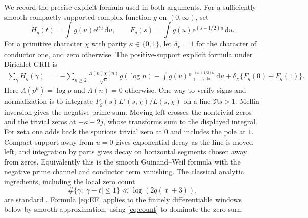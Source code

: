 \documentclass[11pt]{article}
\newcommand{\me}{\mathrm e}
\newcommand{\ii}{\mathrm i}
\newcommand{\dd}{\,\mathrm d}
\begin{document}
We record the precise explicit formula used in both arguments. For a sufficiently smooth compactly supported complex function $g$ on $(0,\infty)$, set
\[
 H_g(t)=\int g(u)\me^{\ii tu}\dd u,\qquad
 F_g(s)=\int g(u)\me^{(s-1/2)u}\dd u .
\]
For a primitive character $\chi$ with parity $\kappa\in\{0,1\}$, let $\delta_\chi=1$ for the character of conductor one, and zero otherwise. The positive-support explicit formula under Dirichlet GRH is
\begin{align}
 \sum_\gamma H_g(\gamma)
 &=-\sum_{n\ge2}\frac{\Lambda(n)\chi(n)}{\sqrt n}g(\log n)
   -\int g(u)\frac{\me^{-(\kappa+1/2)u}}{1-\me^{-2u}}\dd u
   +\delta_\chi\{F_g(0)+F_g(1)\}.\label{eq:EF}
\end{align}
Here $\Lambda(p^k)=\log p$ and $\Lambda(n)=0$ otherwise. One way to verify signs and normalization is to integrate $F_g(s)L'(s,\chi)/L(s,\chi)$ on a line $\Re s>1$. Mellin inversion gives the negative prime sum. Moving left crosses the nontrivial zeros and the trivial zeros at $-\kappa-2j$, whose transforms sum to the displayed integral. For zeta one adds back the spurious trivial zero at $0$ and includes the pole at $1$. Compact support away from $u=0$ gives exponential decay as the line is moved left, and integration by parts gives decay on horizontal segments chosen away from zeros. Equivalently this is the smooth Guinand--Weil formula with the negative prime channel and conductor term vanishing. The classical analytic ingredients, including the local zero count
\begin{equation}
 \#\{\gamma:|\gamma-t|\le1\}\ll\log(2q(|t|+3)),\label{eq:count}
\end{equation}
are standard \cite{mv,bmor,banks}. Formula \eqref{eq:EF} applies to the finitely differentiable windows below by smooth approximation, using \eqref{eq:count} to dominate the zero sum.
\end{document}
